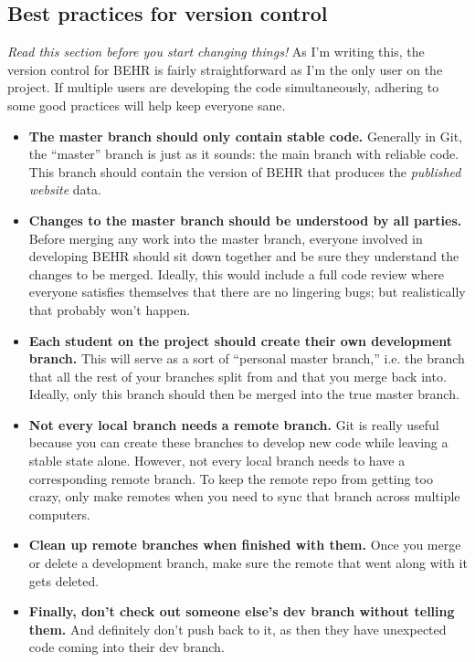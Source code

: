 \documentclass[12pt]{article}
\begin{document}
	\subsection{Best practices for version control}
	\emph{Read this section before you start changing things!} As I'm writing this, the version control for BEHR is fairly straightforward as I'm the only user on the project. If multiple users are developing the code simultaneously, adhering to some good practices will help keep everyone sane.
	
	\begin{itemize}
	\item \textbf{The master branch should only contain stable code.} Generally in Git, the ``master'' branch is just as it sounds: the main branch with reliable code. This branch should contain the version of BEHR that produces the \emph{published website} data.
	\item \textbf{Changes to the master branch should be understood by all parties.} Before merging any work into the master branch, everyone involved in developing BEHR should sit down together and be sure they understand the changes to be merged. Ideally, this would include a full code review where everyone satisfies themselves that there are no lingering bugs; but realistically that probably won't happen.
	\item \textbf{Each student on the project should create their own development branch.}  This will serve as a sort of ``personal master branch,'' i.e. the branch that all the rest of your branches split from and that you merge back into. Ideally, only this branch should then be merged into the true master branch.
	\item \textbf{Not every local branch needs a remote branch.} Git is really useful because you can create these branches to develop new code while leaving a stable state alone. However, not every local branch needs to have a corresponding remote branch.  To keep the remote repo from getting too crazy, only make remotes when you need to sync that branch across multiple computers.
	\item \textbf{Clean up remote branches when finished with them.} Once you merge or delete a development branch, make sure the remote that went along with it gets deleted.
	\item \textbf{Finally, don't check out someone else's dev branch without telling them.} And definitely don't push back to it, as then they have unexpected code coming into their dev branch.
	\end{itemize}
	
\end{document}
